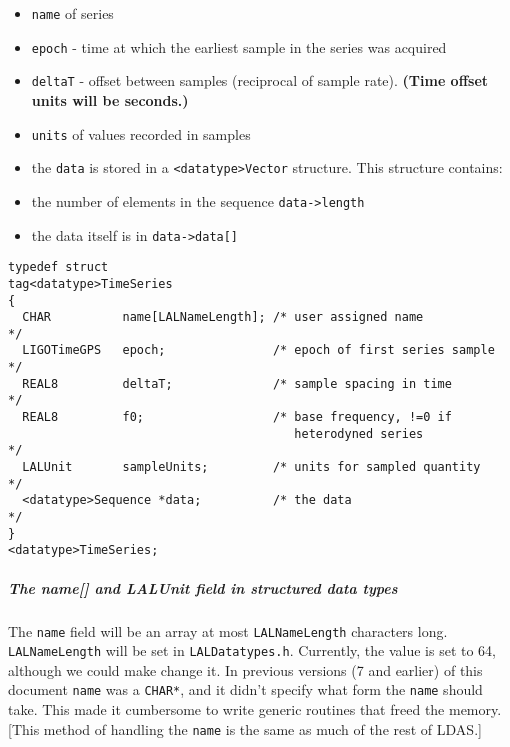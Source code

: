 \documentclass[]{ligodcc}
\renewcommand{\texttt}[1]{{\ttfamily\color{blue}#1}}
\begin{document}
\begin{itemize}
\vspace{-0.15in}
\item
{\tt name} of series
\vspace{-0.15in}
\item
{\tt epoch} - time at which the earliest sample in the series was acquired
\vspace{-0.15in}
\item
{\tt deltaT} -  offset between samples (reciprocal of sample rate).  
{\bf (Time offset units will be seconds.)}
\vspace{-0.15in}
\item
{\tt units} of values recorded in samples
\vspace{-0.15in}
\item
the {\tt data} is stored in a  {\tt <datatype>Vector}  structure. This structure contains:
\vspace{-0.15in}
\item
the number of elements in the sequence {\tt data->length}
\vspace{-0.15in}
\item
the data itself is in {\tt data->data[]}
\end{itemize}

{\footnotesize
\begin{verbatim}
typedef struct
tag<datatype>TimeSeries
{
  CHAR          name[LALNameLength]; /* user assigned name           */
  LIGOTimeGPS   epoch;               /* epoch of first series sample */
  REAL8         deltaT;              /* sample spacing in time       */
  REAL8         f0;                  /* base frequency, !=0 if
                                        heterodyned series           */
  LALUnit       sampleUnits;         /* units for sampled quantity   */
  <datatype>Sequence *data;          /* the data                     */
}
<datatype>TimeSeries;
\end{verbatim}}


\subparagraph{The {\texttt {name[]}} and {\texttt {LALUnit}} field 
in structured data types \\}
\label{name}

The {\tt name} field will be an array at most {\tt LALNameLength} characters long.
{\tt LALNameLength} will be set in {\tt LALDatatypes.h}.  Currently, the value is
set to 64, although we could make change it.  In previous versions (7
and earlier) of this document {\tt name} was a {\tt CHAR*}, and it didn't specify
what form the {\tt name} should take.  This made it cumbersome  to write
generic routines that freed the memory.  [This method of handling the
{\tt name} is the same as much of the rest of LDAS.] 
\end{document}
